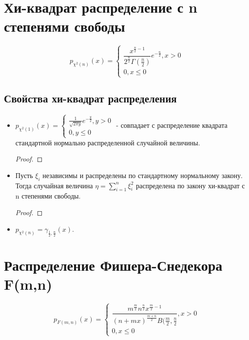 \section{Хи-квадрат распределение с n степенями свободы}

\begin{definition}
  \[
    p_{\chi^2(n)} (x) = \begin{cases}
       \dfrac{x^{\frac{n}{2} - 1}}{2^\frac{n}{2} \Gamma(\frac{n}{2})} e^{-\frac{n}{2}}, x>0 \\
       0, x\leqslant 0
    \end{cases}
  \]
\end{definition}

\subsection{Свойства хи-квадрат распределения}

\begin{itemize}
  \item $p_{\chi^2(1)} (x) = \begin{cases}
      \frac{1}{\sqrt{2\pi y}} e^{-\frac{y}{2}}, y>0 \\
      0, y\leqslant 0
    \end{cases}$ - совпадает с распределение квадрата стандартной нормально распределенной случайной величины.
    
    \begin{proof}
    \end{proof}

  \item Пусть $\xi_i$ независимы и распределены по стандартному нормальному закону. Тогда случайная величина $\eta = \sum_{i=1}^n \xi_i^2$ распределена по закону хи-квадрат с n степенями свободы.
  
    \begin{proof}
    \end{proof}

  \item $p_{\chi^2(n)} = \gamma_{\frac{1}{2}, \frac{n}{2}} (x)$.
\end{itemize}

\section{Распределение Фишера-Снедекора F(m,n)}

\begin{definition}
  \[
    p_{F(m, n)} (x) = \begin{cases}
      \dfrac{m^\frac{m}{2} n^\frac{n}{2} x^{\frac{m}{2}-1}}{(n+mx)^\frac{m+n}{2} B(\frac{m}{2}, \frac{n}{2}}, x>0 \\
      0, x\leqslant 0
    \end{cases}
  \]
\end{definition}

